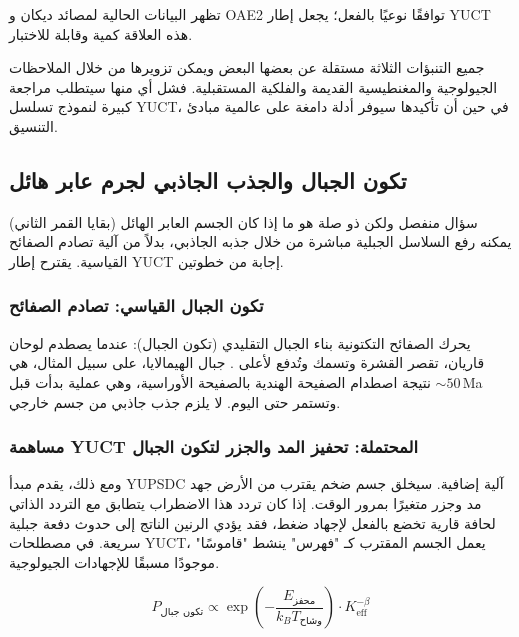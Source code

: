 \documentclass[11pt,a4paper]{article}
\begin{document}
	تظهر البيانات الحالية لمصائد ديكان و OAE2 توافقًا نوعيًا بالفعل؛ يجعل إطار YUCT هذه العلاقة كمية وقابلة للاختبار.
	
	جميع التنبؤات الثلاثة مستقلة عن بعضها البعض ويمكن تزويرها من خلال الملاحظات الجيولوجية والمغنطيسية القديمة والفلكية المستقبلية. فشل أي منها سيتطلب مراجعة كبيرة لنموذج تسلسل YUCT، في حين أن تأكيدها سيوفر أدلة دامغة على عالمية مبادئ التنسيق.
	
	\subsection{تكون الجبال والجذب الجاذبي لجرم عابر هائل}
	
	سؤال منفصل ولكن ذو صلة هو ما إذا كان الجسم العابر الهائل (بقايا القمر الثاني) يمكنه رفع السلاسل الجبلية مباشرة من خلال جذبه الجاذبي، بدلاً من آلية تصادم الصفائح القياسية. يقترح إطار YUCT إجابة من خطوتين.
	
	\subsubsection{تكون الجبال القياسي: تصادم الصفائح}
	
	يحرك الصفائح التكتونية بناء الجبال التقليدي (تكون الجبال): عندما يصطدم لوحان قاريان، تقصر القشرة وتسمك وتُدفع لأعلى \cite{Kearey2013}. جبال الهيمالايا، على سبيل المثال، هي نتيجة اصطدام الصفيحة الهندية بالصفيحة الأوراسية، وهي عملية بدأت قبل \(\sim 50\) Ma وتستمر حتى اليوم. لا يلزم جذب جاذبي من جسم خارجي.
	
	\subsubsection{مساهمة YUCT المحتملة: تحفيز المد والجزر لتكون الجبال}
	
	ومع ذلك، يقدم مبدأ YUPSDC آلية إضافية. سيخلق جسم ضخم يقترب من الأرض جهد مد وجزر متغيرًا بمرور الوقت. إذا كان تردد هذا الاضطراب يتطابق مع التردد الذاتي لحافة قارية تخضع بالفعل لإجهاد ضغط، فقد يؤدي الرنين الناتج إلى حدوث دفعة جبلية سريعة. في مصطلحات YUCT، يعمل الجسم المقترب كـ "فهرس" ينشط "قاموسًا" موجودًا مسبقًا للإجهادات الجيولوجية.
	
	\begin{equation}
		P_{\text{تكون جبال}} \propto \exp\left(-\frac{E_{\text{محفز}}}{k_B T_{\text{وشاح}}}\right) \cdot K_{\mathrm{eff}}^{-\beta}
	\end{equation}
	
\end{document}

